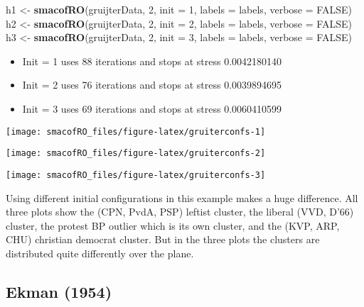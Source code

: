\documentclass[
  12pt,
]{article}
\newenvironment{Shaded}{\begin{snugshade}}{\end{snugshade}}
\newcommand{\AttributeTok}[1]{\textcolor[rgb]{0.13,0.29,0.53}{#1}}
\newcommand{\ConstantTok}[1]{\textcolor[rgb]{0.56,0.35,0.01}{#1}}
\newcommand{\DecValTok}[1]{\textcolor[rgb]{0.00,0.00,0.81}{#1}}
\newcommand{\FunctionTok}[1]{\textcolor[rgb]{0.13,0.29,0.53}{\textbf{#1}}}
\newcommand{\NormalTok}[1]{#1}
\newcommand{\OtherTok}[1]{\textcolor[rgb]{0.56,0.35,0.01}{#1}}
\providecommand{\tightlist}{%
  \setlength{\itemsep}{0pt}\setlength{\parskip}{0pt}}
\begin{document}
\begin{Shaded}
\begin{Highlighting}[]
\NormalTok{h1 }\OtherTok{\textless{}{-}} \FunctionTok{smacofRO}\NormalTok{(gruijterData, }\DecValTok{2}\NormalTok{, }\AttributeTok{init =} \DecValTok{1}\NormalTok{, }\AttributeTok{labels =}\NormalTok{ labels, }\AttributeTok{verbose =} \ConstantTok{FALSE}\NormalTok{)}
\NormalTok{h2 }\OtherTok{\textless{}{-}} \FunctionTok{smacofRO}\NormalTok{(gruijterData, }\DecValTok{2}\NormalTok{, }\AttributeTok{init =} \DecValTok{2}\NormalTok{, }\AttributeTok{labels =}\NormalTok{ labels, }\AttributeTok{verbose =} \ConstantTok{FALSE}\NormalTok{)}
\NormalTok{h3 }\OtherTok{\textless{}{-}} \FunctionTok{smacofRO}\NormalTok{(gruijterData, }\DecValTok{2}\NormalTok{, }\AttributeTok{init =} \DecValTok{3}\NormalTok{, }\AttributeTok{labels =}\NormalTok{ labels, }\AttributeTok{verbose =} \ConstantTok{FALSE}\NormalTok{)}
\end{Highlighting}
\end{Shaded}

\begin{itemize}
\tightlist
\item
  Init = 1 uses 88 iterations and stops at stress 0.0042180140
\item
  Init = 2 uses 76 iterations and stops at stress 0.0039894695
\item
  Init = 3 uses 69 iterations and stops at stress 0.0060410599
\end{itemize}

\begin{center}\texttt{[image: smacofRO\_files/figure-latex/gruiterconfs-1]} \end{center}

\begin{center}\texttt{[image: smacofRO\_files/figure-latex/gruiterconfs-2]} \end{center}

\begin{center}\texttt{[image: smacofRO\_files/figure-latex/gruiterconfs-3]} \end{center}

Using different initial configurations in this example makes a huge difference. All three plots
show the (CPN, PvdA, PSP) leftist cluster, the liberal (VVD, D'66) cluster, the protest BP outlier which is its own cluster, and the (KVP, ARP, CHU) christian democrat cluster. But in the three plots the
clusters are distributed quite differently over the plane.

\subsection{Ekman (1954)}\label{ekman_54}
\end{document}
